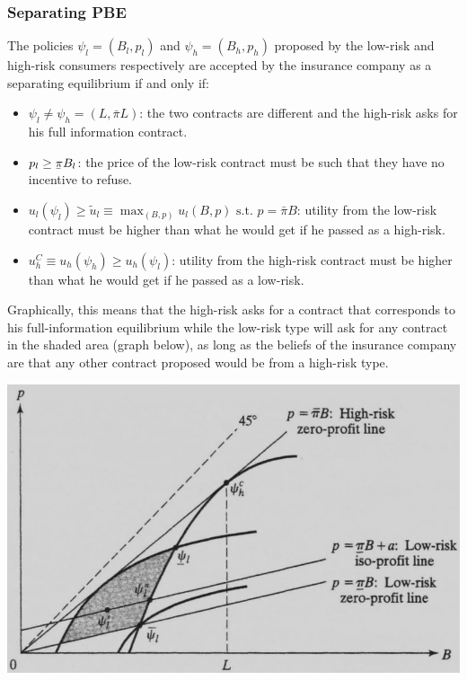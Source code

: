 \documentclass[12pt]{report}
\newcommand{\ubar}[1]{\underaccent{\bar}{#1}}
\begin{document}
\subsubsection{Separating PBE}

The policies $\psi_l = (B_l, p_l)$ and $\psi_h = (B_h, p_h)$ proposed by the low-risk and high-risk consumers respectively are accepted by the insurance company as a separating equilibrium if and only if:\begin{itemize}
\item $\psi_l\neq\psi_h = (L,\bar\pi L)$: the two contracts are different and the high-risk asks for his full information contract.
\item $p_l\geq \ubar\pi B_l$: the price of the low-risk contract must be such that they have no incentive to refuse.
\item $u_l(\psi_l)\geq \tilde u_l\equiv \max_{(B,p)} u_l(B,p)\text{ s.t. } p = \bar\pi B$: utility from the low-risk contract must be higher than what he would get if he passed as a high-risk.
\item $u_h^C \equiv u_h(\psi_h)\geq u_h(\psi_l)$: utility from the high-risk contract must be higher than what he would get if he passed as a low-risk.
\end{itemize} Graphically, this means that the high-risk asks for a contract that corresponds to his full-information equilibrium while the low-risk type will ask for any contract in the shaded area (graph below), as long as the beliefs of the insurance company are that any other contract proposed would be from a high-risk type.\begin{center}
\includegraphics[scale=0.5]{images/advselecsep}
\end{center}
\end{document}
